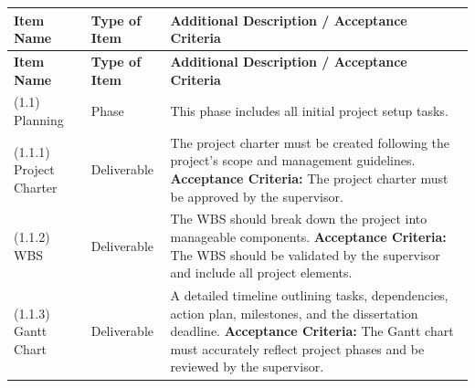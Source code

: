 \begin{longtable}{|p{3cm}|p{2.5cm}|p{8cm}|}
    \hline
    \textbf{Item Name}             & \textbf{Type of Item} & \textbf{Additional Description / Acceptance Criteria}                                                                                                                                                                                                                                                                                                     \\ \hline
    \endfirsthead
    \hline
    \textbf{Item Name}             & \textbf{Type of Item} & \textbf{Additional Description / Acceptance Criteria}                                                                                                                                                                                                                                                                                                     \\ \hline
    \endhead
    (1.1) Planning                 & Phase                 & This phase includes all initial project setup tasks.                                                                                                                                                                                                                                                                                                      \\ \hline
    (1.1.1) Project Charter        & Deliverable           & The project charter must be created following the project's scope and management guidelines. \newline \textbf{Acceptance Criteria:} The project charter must be approved by the supervisor.                                                                                                                                                               \\ \hline
    (1.1.2) \gls{WBS}              & Deliverable           & The \gls{WBS} should break down the project into manageable components. \newline \textbf{Acceptance Criteria:} The WBS should be validated by the supervisor and include all project elements.                                                                                                                                                            \\ \hline
    (1.1.3) Gantt Chart            & Deliverable           & A detailed timeline outlining tasks, dependencies, action plan, milestones, and the dissertation deadline. \newline \textbf{Acceptance Criteria:} The Gantt chart must accurately reflect project phases and be reviewed by the supervisor.                                                                                                               \\ \hline
    \hline %


\end{longtable}
